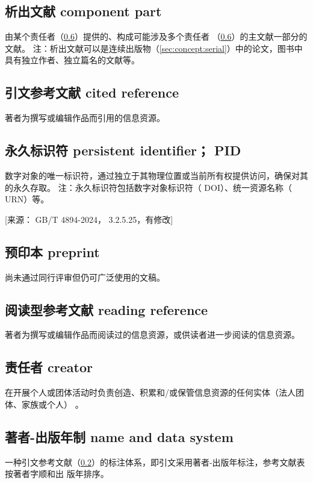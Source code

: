 \documentclass[twoside]{article}%
\begin{document}
{\subsection{析出文献 component part}
由某个责任者（\ref{sec:concept:creator}）提供的、构成可能涉及多个责任者
（\ref{sec:concept:creator}）的主文献一部分的文献。
注：析出文献可以是连续出版物（\ref{sec:concept:serial}）中的论文，图书中具有独立作者、独立篇名的文献等。

\subsection{引文参考文献 cited reference}\label{sec:concept:citeref}
著者为撰写或编辑作品而引用的信息资源。

\subsection{永久标识符 persistent identifier； PID}
数字对象的唯一标识符，通过独立于其物理位置或当前所有权提供访问，确保对其的永久存取。
注：永久标识符包括数字对象标识符（ DOI）、统一资源名称（ URN）等。

[来源： GB/T 4894-2024， 3.2.5.25，有修改]

\subsection{预印本 preprint}
尚未通过同行评审但仍可广泛使用的文稿。


\subsection{阅读型参考文献 reading reference}
著者为撰写或编辑作品而阅读过的信息资源，或供读者进一步阅读的信息资源。

\subsection{责任者 creator}\label{sec:concept:creator}
在开展个人或团体活动时负责创造、积累和/或保管信息资源的任何实体（法人团体、家族或个人） 。


\subsection{著者-出版年制 name and data system}
一种引文参考文献（\ref{sec:concept:citeref}）的标注体系，即引文采用著者-出版年标注，参考文献表按著者字顺和出
版年排序。

}
\end{document}
